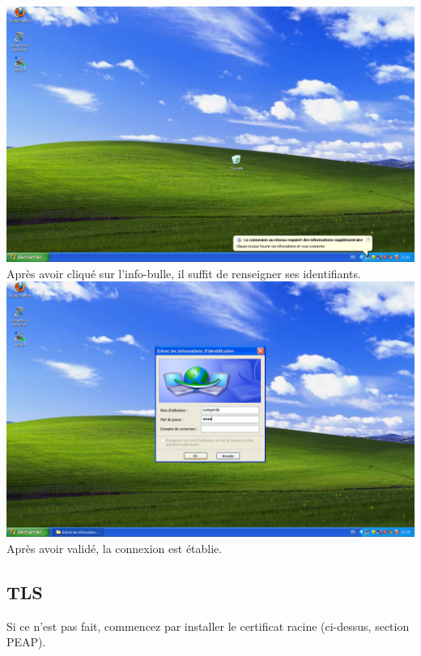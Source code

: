 \includegraphics[width=\screenShotSize{}]{img/md5Info.PNG}\\
Après avoir cliqué sur l'info-bulle, il suffit de renseigner ses identifiants.\\
\includegraphics[width=\screenShotSize{}]{img/credentials.PNG}\\
Après avoir validé, la connexion est établie.



\subsection{TLS}

Si ce n'est pas fait, commencez par installer le certificat racine (ci-dessus, section PEAP).

